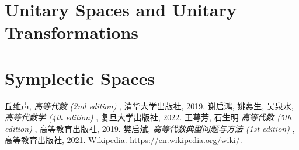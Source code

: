 \documentclass[11pt]{../../TexTemplate/elegantbook} %
\begin{document}
\begin{lemma}
    
\end{lemma}

\section{Unitary Spaces and Unitary Transformations}

\section{Symplectic Spaces}

\begin{thebibliography}{99} 
 丘维声, \emph{ 高等代数 (2nd edition) }, 清华大学出版社, 2019. 
 谢启鸿, 姚慕生, 吴泉水, \emph{ 高等代数学 (4th edition) }, 复旦大学出版社, 2022.
 王萼芳, 石生明 \emph{ 高等代数 (5th edition) }, 高等教育出版社, 2019.
 樊启斌, \emph{ 高等代数典型问题与方法 (1st edition) }, 高等教育出版社, 2021.
 Wikipedia. \url{https://en.wikipedia.org/wiki/}.
\end{thebibliography}
\end{document}
